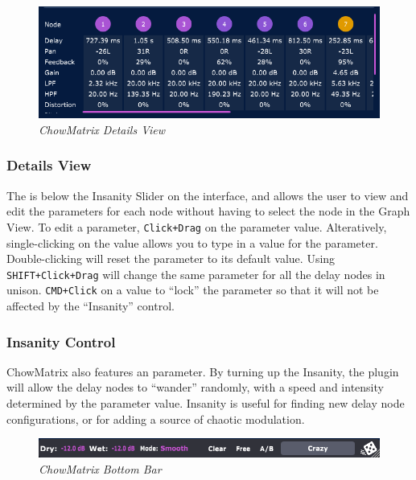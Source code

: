 \documentclass[landscape,twocolumn,a5paper]{manual}
\begin{document}
\begin{figure}[ht]
    \center
    \includegraphics[width=0.8\columnwidth]{screenshots/DetailsView.png}
    \caption{\label{fig:details_view}{\it ChowMatrix Details View}}
\end{figure}

\subsubsection{Details View}
The  is below the Insanity Slider
on the interface, and allows the user to view and edit the
parameters for each node without having to select the node
in the Graph View.
\newpar
To edit a parameter, \texttt{Click+Drag} on the parameter
value. Alteratively, single-clicking on the value allows
you to type in a value for the parameter. Double-clicking
will reset the parameter to its default value.
\newpar
Using \texttt{SHIFT+Click+Drag} will change the same parameter
for all the delay nodes in unison. \texttt{CMD+Click} on a value
to ``lock'' the parameter so that it will not be affected by the
``Insanity'' control.

\subsubsection{Insanity Control}
ChowMatrix also features an  parameter.
By turning up the Insanity, the plugin will allow the delay
nodes to ``wander'' randomly, with a speed and intensity
determined by the parameter value. Insanity is useful for
finding new delay node configurations, or for adding a source
of chaotic modulation.

\begin{figure}[ht]
    \center
    \includegraphics[width=0.95\columnwidth]{screenshots/BottomBar.png}
    \caption{\label{fig:details_view}{\it ChowMatrix Bottom Bar}}
\end{figure}
\end{document}
